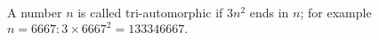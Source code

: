 A number $n$ is called tri-automorphic if $3n^{2}$ 
ends in $n$; for example $n=6667: 3 \times 6667^{2}=133346667.$